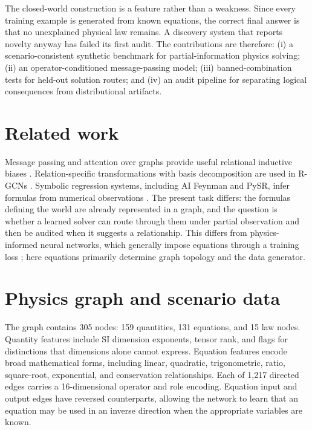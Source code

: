 \documentclass[11pt]{article}
\begin{document}
The closed-world construction is a feature rather than a weakness. Since every training example is generated from known equations, the correct final answer is that no unexplained physical law remains. A discovery system that reports novelty anyway has failed its first audit. The contributions are therefore: (i) a scenario-consistent synthetic benchmark for partial-information physics solving; (ii) an operator-conditioned message-passing model; (iii) banned-combination tests for held-out solution routes; and (iv) an audit pipeline for separating logical consequences from distributional artifacts.

\section{Related work}

Message passing and attention over graphs provide useful relational inductive biases \cite{gilmer2017,kipf2017,velickovic2018,battaglia2018}. Relation-specific transformations with basis decomposition are used in R-GCNs \cite{schlichtkrull2018}. Symbolic regression systems, including AI Feynman and PySR, infer formulas from numerical observations \cite{udrescu2020,cranmer2023}. The present task differs: the formulas defining the world are already represented in a graph, and the question is whether a learned solver can route through them under partial observation and then be audited when it suggests a relationship. This differs from physics-informed neural networks, which generally impose equations through a training loss \cite{raissi2019}; here equations primarily determine graph topology and the data generator.

\section{Physics graph and scenario data}

The graph contains 305 nodes: 159 quantities, 131 equations, and 15 law nodes. Quantity features include SI dimension exponents, tensor rank, and flags for distinctions that dimensions alone cannot express. Equation features encode broad mathematical forms, including linear, quadratic, trigonometric, ratio, square-root, exponential, and conservation relationships. Each of 1,217 directed edges carries a 16-dimensional operator and role encoding. Equation input and output edges have reversed counterparts, allowing the network to learn that an equation may be used in an inverse direction when the appropriate variables are known.
\end{document}
